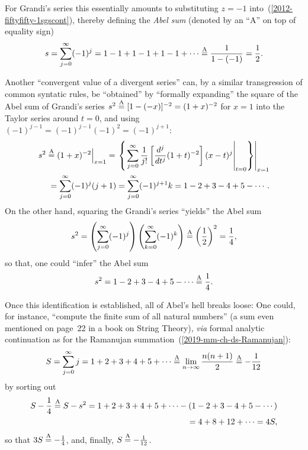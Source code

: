 For Grandi's series
this essentially amounts to substituting $z= - 1$
into~(\ref{2012-fiftyfifty-1sgscont}), thereby defining the
{\em Abel sum} (denoted by an ``A'' on top of equality sign)
\begin{equation}
s=\sum_{j=0}^\infty(-1)^j  = 1-1+1-1+1-1+\cdots \stackrel{{\rm A}}{=} \frac{1}{1-(-1)} = \frac{1}{2}.
\label{2012-fiftyfifty-1sgscont1}
\end{equation}



Another ``convergent value of a divergent series''
can, by a similar transgression of common syntatic rules,
be ``obtained'' by ``formally  expanding''  the square of the Abel sum of
Grandi's series
$
s^2 \stackrel{{\rm A}}{=} [1-(-x)]^{-2} = (1+x)^{-2}
$ for  $x=1$
into the Taylor series\cite{Kline-83}
around $t=0$, and using   $(-1)^{j-1}=(-1)^{j-1}(-1)^{2}=(-1)^{j+1}$:
\begin{equation}
\begin{split}
s^2   \stackrel{{\rm A}}{=} (1+x)^{-2}  \Big|_{x =1}=
\left.\left\{\left.\sum_{j=0}^\infty \frac{1}{j!}\left[\frac{d^j}{d{t}^j}  (1+t)^{-2}\right]   (x-t)^j\right|_{t=0}\right\} \right|_{x=1}
\\
=
\sum_{j=0}^\infty (-1)^j (j+1) =
\sum_{j=0}^\infty (-1)^{j+1} k =
1-2+3-4+5-\cdots
.
\label{2009-fiftyfifty-1s1}
\end{split}
\end{equation}
On the other hand, squaring the Grandi's series ``yields'' the Abel sum
\begin{equation}
s^2 =
\left(\sum_{j=0}^\infty (-1)^j\right)
\left(\sum_{k=0}^\infty (-1)^k\right)
\stackrel{{\rm A}}{=} \left(\frac{1}{2}\right)^2=\frac{1}{4},
\end{equation}
so that, one could ``infer'' the Abel sum
\begin{equation}
s^2 =
1-2+3-4+5-\cdots  \stackrel{{\rm A}}{=} \frac{1}{4}.
\end{equation}


Once this identification is established, all of Abel's hell breaks loose:
One could, for instance, ``compute the finite sum\cite{Sloane_oeis.org/A000217} of all natural numbers\cite{Sloane_oeis.org/A000027}''
(a sum even mentioned on page~22 in a book on String Theory\cite{polchinski_1998}),
{\it via} formal analytic continuation as for the
Ramanujan summation~(\ref{2019-mm-ch-ds-Ramanujan}):  
\begin{equation}
S  =
\sum_{j=0}^\infty j = 1+2+3+4+5 + \cdots
\stackrel{{\rm A}}{=} \lim_{n\rightarrow \infty} \frac{n(n+1)}{2}
\stackrel{{\rm A}}{=} - \frac{1}{12}
\label{2016-m-ch-ds-natnumser}
\end{equation}
by sorting out
\begin{equation}
\begin{split}
S - \frac{1}{4}\stackrel{{\rm A}}{=}
S-s^2  = 1+2+3+4+5 + \cdots -
(1-2+3-4+5-\cdots )   \\
= 4 + 8+ 12 +  \cdots = 4 S
,
\label{2016-m-ch-ds-natnumser2}
\end{split}
\end{equation}
so that  $3 S
\stackrel{{\rm A}}{=}  - \frac{1}{4}$,
and, finally, $S
\stackrel{{\rm A}}{=}  - \frac{1}{12}$.

